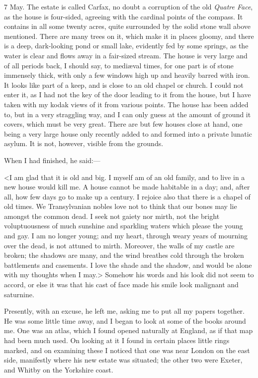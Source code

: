 \begin{diary}{7 May.}
The estate is called Carfax, no doubt a corruption of the old \textit{Quatre Face}, as the house is four-sided, agreeing with the cardinal points of the compass. It contains in all some twenty acres, quite surrounded by the solid stone wall above mentioned. There are many trees on it, which make it in places gloomy, and there is a deep, dark-looking pond or small lake, evidently fed by some springs, as the water is clear and flows away in a fair-sized stream. The house is very large and of all periods back, I should say, to mediæval times, for one part is of stone immensely thick, with only a few windows high up and heavily barred with iron. It looks like part of a keep, and is close to an old chapel or church. I could not enter it, as I had not the key of the door leading to it from the house, but I have taken with my kodak views of it from various points. The house has been added to, but in a very straggling way, and I can only guess at the amount of ground it covers, which must be very great. There are but few houses close at hand, one being a very large house only recently added to and formed into a private lunatic asylum. It is not, however, visible from the grounds.


When I had finished, he said:—

<I am glad that it is old and big. I myself am of an old family, and to live in a new house would kill me. A house cannot be made habitable in a day; and, after all, how few days go to make up a century. I rejoice also that there is a chapel of old times. We Transylvanian nobles love not to think that our bones may lie amongst the common dead. I seek not gaiety nor mirth, not the bright voluptuousness of much sunshine and sparkling waters which please the young and gay. I am no longer young; and my heart, through weary years of mourning over the dead, is not attuned to mirth. Moreover, the walls of my castle are broken; the shadows are many, and the wind breathes cold through the broken battlements and casements. I love the shade and the shadow, and would be alone with my thoughts when I may.> Somehow his words and his look did not seem to accord, or else it was that his cast of face made his smile look malignant and saturnine.

Presently, with an excuse, he left me, asking me to put all my papers together. He was some little time away, and I began to look at some of the books around me. One was an atlas, which I found opened naturally at England, as if that map had been much used. On looking at it I found in certain places little rings marked, and on examining these I noticed that one was near London on the east side, manifestly where his new estate was situated; the other two were Exeter, and Whitby on the Yorkshire coast.


\end{diary}
